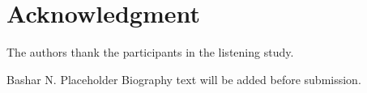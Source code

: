 \documentclass{ieeeaccess}
\begin{document}







\section*{Acknowledgment}
The authors thank the participants in the listening study.




\begin{IEEEbiography}{Bashar N. Placeholder}
Biography text will be added before submission.
\end{IEEEbiography}

\EOD
\end{document}
